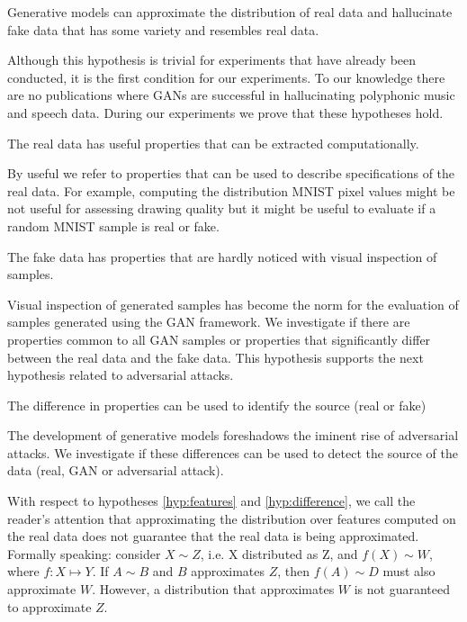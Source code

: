 \begin{hyp} \label{hyp:generate}
Generative models can approximate the distribution of real data and hallucinate
fake data that has some variety and resembles real data. 
\end{hyp}

Although this hypothesis is trivial for experiments that have already been
conducted, it is the first condition for our experiments. To our knowledge 
there are no publications where GANs are successful in hallucinating polyphonic 
music and speech data. During our experiments we prove that these hypotheses hold.

\begin{hyp} \label{hyp:features}
The real data has useful properties that can be extracted computationally.
\end{hyp}
By useful we refer to properties that can be used to describe specifications of the real
data. For example, computing the distribution MNIST pixel values might be not
useful for assessing drawing quality but it might be useful to evaluate
if a random MNIST sample is real or fake.

\begin{hyp} \label{hyp:visual}
The fake data has properties that are hardly noticed with visual inspection of
samples.
\end{hyp}
Visual inspection of generated samples has become the norm for the evaluation of
samples generated using the GAN framework. We investigate if there are
properties common to all GAN samples or properties that significantly differ
between the real data and the fake data. 
This hypothesis supports the next hypothesis related to adversarial attacks. 

\begin{hyp} \label{hyp:difference}
The difference in properties can be used to identify the source (real or fake)
\end{hyp}
The development of generative models foreshadows the iminent
rise of adversarial attacks. We investigate if these differences can be used to
detect the source of the data (real, GAN or adversarial attack). 

With respect to hypotheses \ref{hyp:features} and \ref{hyp:difference}, we call the reader's attention that approximating the distribution over features
computed on the real data does not guarantee that the real data is being
approximated. Formally speaking:
consider $X \sim Z$, i.e. X distributed as Z, and $f(X) \sim W$, where $f: X
\mapsto Y$.
If $A \sim B$ and $B$ approximates $Z$, then $f(A) \sim D$ must also approximate $W$.
However, a distribution that approximates $W$ is not guaranteed to approximate
$Z$.


